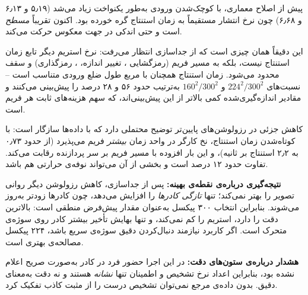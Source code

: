 پیش از اصلاح معماری،  با کوچک‌شدن ورودی به‌طور یکنواخت زیاد می‌شد (۵٫۱۹ و ۶٫۱۳ و ۶٫۶۸) چون نرخ انتشار مستقیماً به زمان استنتاج گره خورده بود. اکنون  تقریباً \emph{مسطح} است و حتی اندکی در جهت معکوس حرکت می‌کند.

این دقیقاً همان چیزی است که از جداسازی انتظار می‌رفت: نرخ استریم دیگر تابع زمان استنتاج نیست، بلکه به مسیر فریم (رمزگشایی ، تغییر اندازه، ، رمزگذاری) و سقف  محدود می‌شود. زمان استنتاج همچنان با مربع طول ضلع ورودی متناسب است -- نسبت‌های $224^2/300^2$ و $160^2/300^2$ به‌ترتیب حدود ۵۶ و ۲۸ درصد را پیش‌بینی می‌کنند و مقادیر اندازه‌گیری‌شده کمی بالاتر از این پیش‌بینی‌اند، که سهم هزینه‌های ثابت هر فریم است.

کاهش جزئی  در رزولوشن‌های پایین‌تر توضیح محتملی دارد که با داده‌ها سازگار است: با کوتاه‌شدن زمان استنتاج، نخ کارگر در واحد زمان \emph{بیشتر} فریم می‌پذیرد (از حدود ۰٫۷۳ به ۲٫۲ استنتاج بر ثانیه)، و این بار افزوده با مسیر فریم بر سر پردازنده رقابت می‌کند. تفاوت حدود ۱۲ درصد است و بخشی از آن می‌تواند نوفه‌ی حرارتی هم باشد.

\textbf{نتیجه‌گیری درباره‌ی نقطه‌ی بهینه:} پس از جداسازی، کاهش رزولوشن دیگر روانی تصویر را بهتر نمی‌کند؛ تنها \emph{تازگی کادرها} را افزایش می‌دهد، چون کادرها زودتر به‌روز می‌شوند. بنابراین انتخاب ۳۰۰ پیکسل به‌عنوان مقدار پیش‌فرض منطقی است: بالاترین دقت را دارد،  استریم را کم نمی‌کند، و تنها بهایش تأخیر بیشتر کادر روی سوژه‌ی متحرک است. اگر کاربرد نیازمند دنبال‌کردن دقیق سوژه‌ی سریع باشد، ۲۲۴ پیکسل مصالحه‌ی بهتری است.

\textbf{هشدار درباره‌ی ستون‌های دقت:} در این اجرا حضور فرد در کادر به‌صورت صریح اعلام نشده بود، بنابراین اعداد نرخ تشخیص و اطمینان تنها \emph{نشانه} هستند و نه دقت به‌معنای دقیق. بدون داده‌ی مرجع نمی‌توان تشخیص درست را از مثبت کاذب تفکیک کرد.
